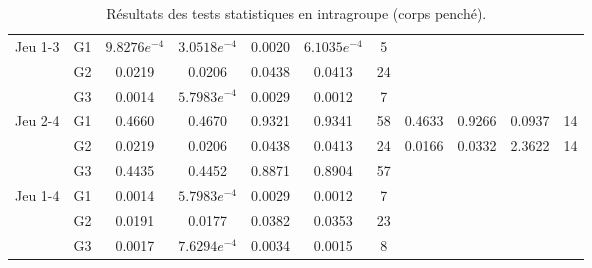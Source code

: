 {\begin{landscape}
\begin{table}[]
\begin{tabular}{ll|ccccc|cccc}
   \multirow{3}{*}{Jeu 1-3} & G1 & \cellcolor{green!25} $9.8276e^{-4}$ & \cellcolor{green!25} $3.0518e^{-4}$ & \cellcolor{green!25} 0.0020 & \cellcolor{green!25} $6.1035e^{-4}$ & 5 &  &  &  &  \\
    & G2 & \cellcolor{green!25} 0.0219 & \cellcolor{green!25} 0.0206 & \cellcolor{green!25} 0.0438 & \cellcolor{green!25} 0.0413 & 24 &  &  &  &  \\
    & G3 & \cellcolor{green!25} 0.0014 & \cellcolor{green!25} $5.7983e^{-4}$ & \cellcolor{green!25} 0.0029 & \cellcolor{green!25} 0.0012 & 7 &  &  &  &  \\ \hline
   \multirow{3}{*}{Jeu 2-4} & G1 & 0.4660 & 0.4670 & 0.9321 & 0.9341 & 58 & 0.4633 & 0.9266 & 0.0937 & 14 \\
    & G2 & \cellcolor{green!25} 0.0219 & \cellcolor{green!25} 0.0206 & \cellcolor{green!25} 0.0438 & \cellcolor{green!25} 0.0413 & 24 & \cellcolor{green!25} 0.0166 & \cellcolor{green!25} 0.0332 & 2.3622 & 14 \\
    & G3 & 0.4435 & 0.4452 & 0.8871 & 0.8904 & 57 &  &  &  &  \\ \hline
   \multirow{3}{*}{Jeu 1-4} & G1 & \cellcolor{green!25} 0.0014 & \cellcolor{green!25} $5.7983e^{-4}$ & \cellcolor{green!25} 0.0029 & \cellcolor{green!25} 0.0012 & 7 &  &  &  &  \\
    & G2 & \cellcolor{green!25} 0.0191 & \cellcolor{green!25} 0.0177 & \cellcolor{green!25} 0.0382 & \cellcolor{green!25} 0.0353 & 23 &  &  &  &  \\
    & G3 & \cellcolor{green!25} 0.0017 & \cellcolor{green!25} $7.6294e^{-4}$ & \cellcolor{green!25} 0.0034 & \cellcolor{green!25} 0.0015 & 8 &  &  &  &
\end{tabular}
\caption{Résultats des tests statistiques en intragroupe (corps penché).}
\label{tab:leaning_intra}
\end{table}
\end{landscape}}

